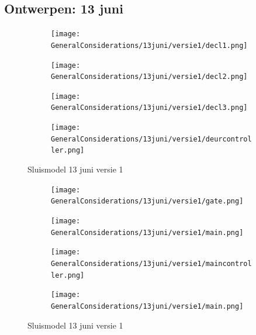 \documentclass{article}
\begin{document}
	\subsection{Ontwerpen: 13 juni}
	\begin{figure}
		\centering
		\begin{subfigure}{0.45\linewidth}
			\texttt{[image: GeneralConsiderations/13juni/versie1/decl1.png]}
			\caption{}
			\label{fig:1a}
		\end{subfigure}\hfill
		\begin{subfigure}{0.45\linewidth}
			\texttt{[image: GeneralConsiderations/13juni/versie1/decl2.png]}
			\caption{}
			\label{fig:1a}
		\end{subfigure}
		
		\begin{subfigure}{0.45\linewidth}
			\texttt{[image: GeneralConsiderations/13juni/versie1/decl3.png]}
			\caption{}
			\label{fig:1a}
		\end{subfigure}\hfill
		\begin{subfigure}{0.45\linewidth}
			\texttt{[image: GeneralConsiderations/13juni/versie1/deurcontroller.png]}
			\caption{}
			\label{fig:1a}
		\end{subfigure}
		\caption{Sluismodel 13 juni versie 1}
		\label{fig:1}
	\end{figure}
	
	\begin{figure}
		\centering
		\begin{subfigure}{0.45\linewidth}
			\texttt{[image: GeneralConsiderations/13juni/versie1/gate.png]}
			\caption{}
			\label{fig:1a}
		\end{subfigure}\hfill
		\begin{subfigure}{0.45\linewidth}
			\texttt{[image: GeneralConsiderations/13juni/versie1/main.png]}
			\caption{}
			\label{fig:1a}
		\end{subfigure}
		
		\begin{subfigure}{0.45\linewidth}
			\texttt{[image: GeneralConsiderations/13juni/versie1/maincontroller.png]}
			\caption{}
			\label{fig:1a}
		\end{subfigure}\hfill
		\begin{subfigure}{0.45\linewidth}
			\texttt{[image: GeneralConsiderations/13juni/versie1/main.png]}
			\caption{}
			\label{fig:1a}
		\end{subfigure}
		\caption{Sluismodel 13 juni versie 1}
		\label{fig:1}
	\end{figure}
	
\end{document}
